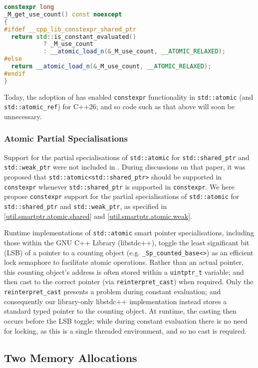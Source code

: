 \documentclass[10pt]{article}
\newcommand*{\wgxxi}[1]{[\href{https://wg21.link/#1}{#1}]}
\begin{document}
\begin{lstlisting}[language=cpp]
constexpr long
_M_get_use_count() const noexcept
{
#ifdef __cpp_lib_constexpr_shared_ptr
  return std::is_constant_evaluated()
           ? _M_use_count
           : __atomic_load_n(&_M_use_count, __ATOMIC_RELAXED);
#else
  return __atomic_load_n(&_M_use_count, __ATOMIC_RELAXED);
#endif
}
\end{lstlisting}

Today, the adoption of \cite{P3309R3} has enabled \texttt{constexpr}
functionality in \texttt{std::atomic} (and \texttt{std::atomic\_ref}) for
C++26; and so code such as that above will soon be unnecessary.

\subsubsection{Atomic Partial Specialisations}

Support for the partial specialisations of \texttt{std::atomic} for
\texttt{std::shared\_ptr} and \texttt{std::weak\_ptr} were not included in
\cite{P3309R3}. During discussions on that paper, it was proposed that
\texttt{std::atomic<std::shared\_ptr>} should be supported in
\texttt{constexpr} whenever \texttt{std::shared\_ptr} is supported in
\texttt{constexpr}. We here propose \texttt{constexpr} support for the partial
specialisations of \texttt{std::atomic} for \texttt{std::shared\_ptr} and
\texttt{std::weak\_ptr}, as specified in \wgxxi{util.smartptr.atomic.shared}
and \wgxxi{util.smartptr.atomic.weak}.

Runtime implementations of \texttt{std::atomic} smart pointer specialisations,
including those within the GNU C++ Library (libstdc++), toggle the least
significant bit (LSB) of a pointer to a counting object (e.g.
\texttt{\_Sp\_counted\_base<>}) as an efficient lock semaphore to facilitate
atomic operations. Rather than an actual pointer, this counting object's
address is often stored within a \texttt{uintptr\_t} variable; and then cast to
the correct pointer (via \texttt{reinterpret\_cast}) when required. Only the
\texttt{reinterpret\_cast} presents a problem during constant evaluation; and
consequently our library-only libstdc++ implementation instead stores a standard
typed pointer to the counting object. At runtime, the casting then occurs before
the LSB toggle; while during constant evaluation there is no need for locking,
as this is a single threaded environment, and so no cast is required.

\subsection{Two Memory Allocations}
\end{document}
